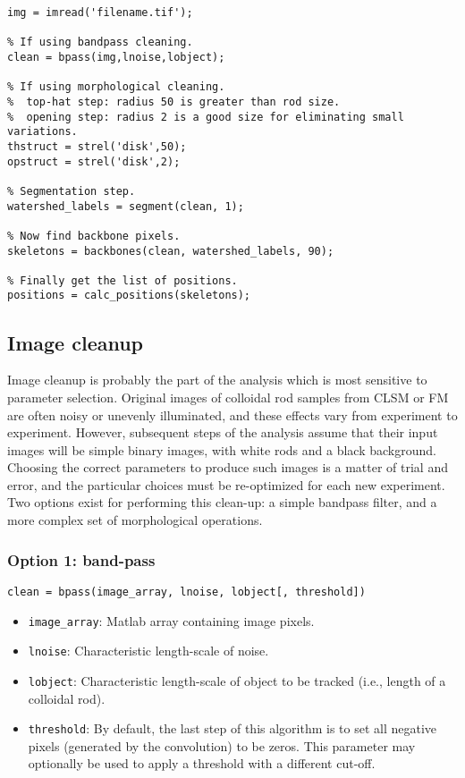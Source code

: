 \begin{lstlisting}[label=ls:manual,caption=Typical sequence of a manual analysis]
% Load the image.
img = imread('filename.tif');

% If using bandpass cleaning.
clean = bpass(img,lnoise,lobject);

% If using morphological cleaning.
%  top-hat step: radius 50 is greater than rod size.
%  opening step: radius 2 is a good size for eliminating small variations.
thstruct = strel('disk',50);
opstruct = strel('disk',2);

% Segmentation step.
watershed_labels = segment(clean, 1);

% Now find backbone pixels.
skeletons = backbones(clean, watershed_labels, 90);

% Finally get the list of positions.
positions = calc_positions(skeletons);
\end{lstlisting}

\subsection{Image cleanup}

Image cleanup is probably the part of the analysis which is most sensitive to parameter selection.
Original images of colloidal rod samples from CLSM or FM are often noisy or unevenly illuminated, and these
effects vary from experiment to experiment.  However, subsequent steps of the analysis assume that their input
images will be simple binary images, with white rods and a black background. Choosing the correct parameters 
to produce such images is a matter of trial and error, and the particular choices must be re-optimized
for each new experiment.  Two options exist for performing this clean-up: a simple bandpass filter, 
and a more complex set of morphological operations.

\subsubsection{Option 1: band-pass}

\texttt{clean = bpass(image\_array, lnoise, lobject[, threshold])}

\begin{itemize}
\item \texttt{image\_array}: Matlab array containing image pixels.
\item \texttt{lnoise}: Characteristic length-scale of noise.
\item \texttt{lobject}: Characteristic length-scale of object to be tracked (i.e., length of a colloidal rod).
\item \texttt{threshold}: By default, the last step of this algorithm is to set all negative pixels (generated
by the convolution) to be zeros. This parameter may optionally be used to apply a threshold with a different cut-off.
\end{itemize}

